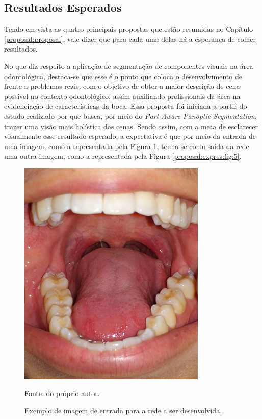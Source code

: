 \subsection{Resultados Esperados}
\label{proposal:expres}
Tendo em vista as quatro principais propostas que estão resumidas no Capítulo \ref{proposal:proposal}, vale dizer que para cada uma delas há a esperança de colher resultados.

No que diz respeito a aplicação de segmentação de componentes visuais na área odontológica, destaca-se que esse é o ponto que coloca o desenvolvimento de frente a problemas reais, com o objetivo de obter a maior descrição de cena possível no contexto odontológico, assim auxiliando profissionais da área na evidenciação de características da boca. Essa proposta foi iniciada a partir do estudo realizado por \cite{DeGeus2021} que busca, por meio do \textit{Part-Aware Panoptic Segmentation}, trazer uma visão mais holística das cenas. Sendo assim, com a meta de esclarecer visualmente esse resultado esperado, a expectativa é que por meio da entrada de uma imagem, como a representada pela Figura \ref{proposal:expres:fig:4}, tenha-se como saída da rede uma outra imagem, como a representada pela Figura \ref{proposal:expres:fig:5}.

\begin{figure}[H]
    \centering
    \caption{Exemplo de imagem de entrada para a rede a ser desenvolvida.}
    \includegraphics[height=4.3in]{recursos/imagens/proposal/boca.png}
    \label{proposal:expres:fig:4}

    Fonte: do próprio autor.
\end{figure}

